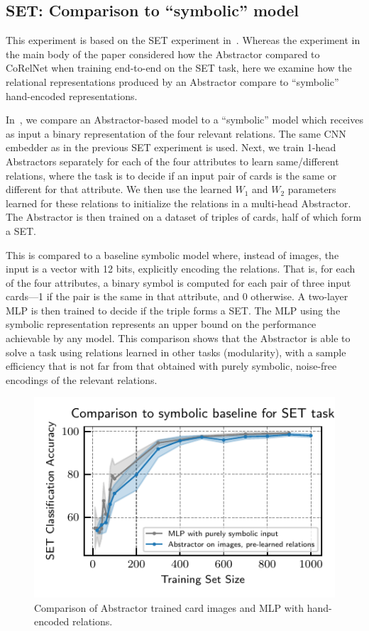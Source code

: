\subsection{SET: Comparison to ``symbolic'' model}

This experiment is based on the SET experiment in~. Whereas the experiment in the main body of the paper considered how the Abstractor compared to CoRelNet when training end-to-end on the SET task, here we examine how the relational representations produced by an Abstractor compare to ``symbolic'' hand-encoded representations.

In~, we compare an Abstractor-based model to a ``symbolic'' model which receives as input a binary representation of the four relevant relations. The same CNN embedder as in the previous SET experiment is used. Next, we train 1-head Abstractors separately for each of the four attributes to learn same/different relations, where the task is to decide if an input pair of cards is the same or different for that attribute. We then use the learned $W_1$ and $W_2$ parameters learned for these relations to initialize the relations in a multi-head Abstractor. The Abstractor is then trained on a dataset of triples of cards, half of which form a SET.

This is compared to a baseline symbolic model where, instead of images, the input is a vector with 12 bits,
explicitly encoding the relations. That is, for each of the four attributes, a binary symbol is computed for each pair of three input cards---1 if the pair is the same in that attribute, and 0 otherwise. A two-layer MLP is then trained to decide if the triple forms a SET. The MLP using the symbolic representation represents an upper bound on the performance achievable by any model. This comparison shows that the Abstractor is able to solve a task using relations learned in other tasks (modularity), with a sample efficiency that is not far from that obtained with purely symbolic, noise-free encodings of the relevant relations.

\begin{figure}[ht]
    \centering

    \includegraphics{figures/experiments/set_symbolic_vs_abstractor.pdf}
    \caption{Comparison of Abstractor trained card images and MLP with hand-encoded relations.}%
    \label{fig:exp_set_symbolic}
\end{figure}